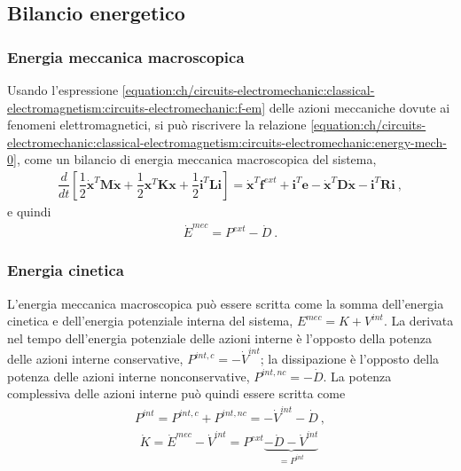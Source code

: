 \documentclass[letterpaper,10pt,italian]{jupyterBook}
\begin{document}
\subsection{Bilancio energetico}
\label{\detokenize{ch/circuits-electromechanic:bilancio-energetico}}

\subsubsection{Energia meccanica macroscopica}
\label{\detokenize{ch/circuits-electromechanic:energia-meccanica-macroscopica}}
\sphinxAtStartPar
Usando l’espressione \eqref{equation:ch/circuits-electromechanic:classical-electromagnetism:circuits-electromechanic:f-em} delle azioni meccaniche dovute ai fenomeni elettromagnetici, si può riscrivere la relazione \eqref{equation:ch/circuits-electromechanic:classical-electromagnetism:circuits-electromechanic:energy-mech-0}, come un bilancio di energia meccanica macroscopica del sistema,
\begin{equation*}
\begin{split}\dfrac{d}{dt} \left[ \dfrac{1}{2} \dot{\mathbf{x}}^T \mathbf{M} \dot{\mathbf{x}} + \dfrac{1}{2} \mathbf{x}^T \mathbf{K} \mathbf{x} + \dfrac{1}{2} \mathbf{i}^T \mathbf{L} \mathbf{i} \right] = \dot{\mathbf{x}}^T \mathbf{f}^{ext} + \mathbf{i}^T \mathbf{e} - \dot{\mathbf{x}}^T \mathbf{D} \dot{\mathbf{x}} - \mathbf{i}^T \mathbf{R} \mathbf{i} \ , \end{split}
\end{equation*}
\sphinxAtStartPar
e quindi
\begin{equation*}
\begin{split}\dot{E}^{mec} = P^{ext} - \dot{D} \ .\end{split}
\end{equation*}

\subsubsection{Energia cinetica}
\label{\detokenize{ch/circuits-electromechanic:energia-cinetica}}
\sphinxAtStartPar
L’energia meccanica macroscopica può essere scritta come la somma dell’energia cinetica e dell’energia potenziale interna del sistema, \(E^{mec} = K + V^{int}\). La derivata nel tempo dell’energia potenziale delle azioni interne è l’opposto della potenza delle azioni interne conservative, \(P^{int, c} = - \dot{V}^{int}\); la dissipazione è l’opposto della potenza delle azioni interne non\sphinxhyphen{}conservative, \(P^{int, nc} = - \dot{D}\). La potenza complessiva delle azioni interne può quindi essere scritta come
\begin{equation*}
\begin{split}P^{int} = P^{int, c} + P^{int, nc} = - \dot{V}^{int} - \dot{D} \ ,\end{split}
\end{equation*}\begin{equation*}
\begin{split}\dot{K} = \dot{E}^{mec} - \dot{V}^{int} = P^{ext} \underbrace{- \dot{D} - \dot{V}^{int}}_{=P^{int}} \  \end{split}
\end{equation*}
\end{document}
